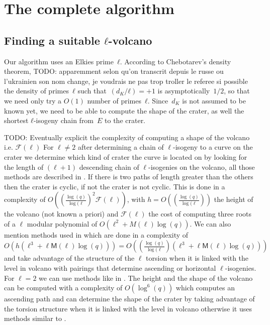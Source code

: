 \documentclass{lms}
\newcommand{\todo}[1]{{\color{red}TODO: #1}}
\begin{document}
\section{The complete algorithm}
\label{sec:complete-algorithm}
\subsection{Finding a suitable $ℓ$-volcano}
\label{sub:shape-volcano}

Our algorithm uses an Elkies prime~$ℓ$.
According to Chebotarev's density theorem,
\todo{apparemment selon qu'on transcrit depuis le russe ou l'ukrainien
son nom change, je voudrais ne pas trop troller le referee si possible}
the density of primes~$ℓ$ such that~$(d_K/ℓ) = +1$ is asymptotically~$1/2$,
so that we need only try a $O(1)$ number of primes~$ℓ$.
Since~$d_K$ is not assumed to be known yet,
we need to be able to compute the shape of the crater,
as well the shortest $ℓ$-isogeny chain from~$E$ to the crater.

\todo{Eventually explicit the complexity of computing a shape of the volcano i.e. $\mathcal{F}(\ell)$}
  For $\ell \neq 2$ after determining a chain of $\ell$-isogeny to a curve on the crater we determine which kind of crater the curve is located on by looking for  the length of $(\ell+1)$ descending chain of $\ell$-isogenies on the volcano, all those methods are described in \cite{volcano}. If there is two paths of length greater than the others then the crater is cyclic, if not the crater is not cyclic. This is done in a complexity of $O( ( \frac{\log(q)}{\log(\ell})^2 \mathcal{F}(\ell) )$, with $h=O(( \frac{\log(q)}{\log(\ell}))$ the height of the volcano (not known a priori) and $\mathcal{F}(\ell)$ the cost of computing three roots of a $\ell$ modular polynomial of $O(\ell^2+M(\ell)\log(q))$. We can also mention methods used in \cite{IonicaJ10} which are done in a complexity of $O(h(\ell^3+\ell \mathsf{M}(\ell) \log(q)))=O(( \frac{\log(q)}{\log(\ell})(\ell^3+\ell \mathsf{M}(\ell) \log(q)))$ and take advantage of the structure of the $\ell$ torsion when it is linked with the level in volcano with pairings that determine ascending or horizontal $\ell$-isogenies. %
\newline 
For $\ell=2$ we can use methods like in \cite{MiretMRV05}. The height and the shape of the volcano can be computed with a complexity of $O(\log^6(q))$ which computes an ascending path and can determine the shape of the crater by taking advantage of the torsion structure when it is linked with the level in volcano otherwise it uses methods similar to \cite{volcano}.
  
\end{document}

